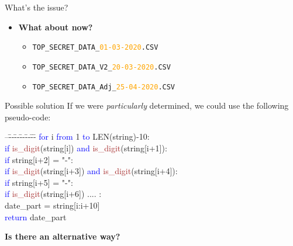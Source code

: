 \documentclass[
	usenames,
	dvipsnames,
] {beamer}
\newcommand{\kw}[1]{\textcolor{blue}{#1}}
\newcommand{\fun}[1]{\textcolor{brown}{#1}}
\begin{document}
\begin{frame}{What's the issue?}
	\begin{itemize}[label=\textbullet]
		\item \textbf{What about now?} \\
		      \medskip
		      \begin{itemize}
			      	\item \texttt{TOP\_SECRET\_DATA\_\textcolor{orange}{01-03-2020}.CSV}
			      	\item \texttt{TOP\_SECRET\_DATA\_V2\_\textcolor{orange}{20-03-2020}.CSV}
			      	\item \texttt{TOP\_SECRET\_DATA\_Adj\_\textcolor{orange}{25-04-2020}.CSV}
		      \end{itemize}
	\end{itemize}
\end{frame}
    
\begin{frame}{Possible solution}
	If we were \textit{particularly} determined, we could use the following pseudo-code: \\
		\pause
	\medskip
		
	\begin{ttfamily}
		\begin{tabbing}
			\small
			--\=--\=--\=--\=--\=--\=\kill
			\kw{for} i \kw{from} 1 \kw{to} LEN(string)-10: \\
				\pause
			\> \kw{if} \fun{is\_digit}(string[i]) \kw{and} \fun{is\_digit}(string[i+1]): \\
				\pause
			\>\> \kw{if} string[i+2] = "-": \\
				\pause
			\>\>\> \kw{if} \fun{is\_digit}(string[i+3]) \kw{and} \fun{is\_digit}(string[i+4]): \\
				\pause
			\>\>\>\> \kw{if} string[i+5] = "-": \\
				\pause
			\>\>\>\>\> \kw{if} \fun{is\_digit}(string[i+6]) .... : \\
				\pause
			\>\>\>\>\>\> date\_part = string[i:i+10] \\
				\pause
			\>\>\>\>\>\> \kw{return} date\_part \\
				\pause
		\end{tabbing}
	\end{ttfamily}
	
	\bigskip
	\textbf{Is there an alternative way?}
\end{frame}
    
\end{document}
